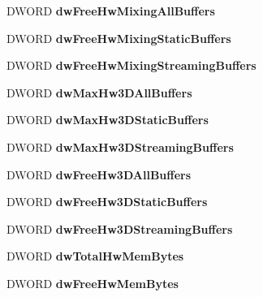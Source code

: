 \begin{DoxyCompactItemize}
D\+W\+O\+RD {\bfseries dw\+Free\+Hw\+Mixing\+All\+Buffers}
\item 
\mbox{\label{struct___d_s_c_a_p_s_a56367d5c0c0b0eb1fbd2903925ddd52a}} 
D\+W\+O\+RD {\bfseries dw\+Free\+Hw\+Mixing\+Static\+Buffers}
\item 
\mbox{\label{struct___d_s_c_a_p_s_a61d06b27d0885d632ab4b0362a09fd46}} 
D\+W\+O\+RD {\bfseries dw\+Free\+Hw\+Mixing\+Streaming\+Buffers}
\item 
\mbox{\label{struct___d_s_c_a_p_s_aebf532fb8ced15674d5036be79c6aef4}} 
D\+W\+O\+RD {\bfseries dw\+Max\+Hw3\+D\+All\+Buffers}
\item 
\mbox{\label{struct___d_s_c_a_p_s_a414aac4889d71650c616d284d2a34f39}} 
D\+W\+O\+RD {\bfseries dw\+Max\+Hw3\+D\+Static\+Buffers}
\item 
\mbox{\label{struct___d_s_c_a_p_s_a1f1c91dea1f61ec116631afb8d040de9}} 
D\+W\+O\+RD {\bfseries dw\+Max\+Hw3\+D\+Streaming\+Buffers}
\item 
\mbox{\label{struct___d_s_c_a_p_s_af700461df782af46f4e3a67c65e0ea0c}} 
D\+W\+O\+RD {\bfseries dw\+Free\+Hw3\+D\+All\+Buffers}
\item 
\mbox{\label{struct___d_s_c_a_p_s_a467e983988672ced4e0c928f40773f9d}} 
D\+W\+O\+RD {\bfseries dw\+Free\+Hw3\+D\+Static\+Buffers}
\item 
\mbox{\label{struct___d_s_c_a_p_s_a3bf6b7713a0210976870e0660e13b106}} 
D\+W\+O\+RD {\bfseries dw\+Free\+Hw3\+D\+Streaming\+Buffers}
\item 
\mbox{\label{struct___d_s_c_a_p_s_a4f6697d62521c353479444671ebd0c63}} 
D\+W\+O\+RD {\bfseries dw\+Total\+Hw\+Mem\+Bytes}
\item 
\mbox{\label{struct___d_s_c_a_p_s_aed2d2047b3c1380dbba020990bbb1a7e}} 
D\+W\+O\+RD {\bfseries dw\+Free\+Hw\+Mem\+Bytes}
\item 
\mbox{\label{struct___d_s_c_a_p_s_a095c40b0ea7be9112cfe2fae808bfe43}} 

\end{DoxyCompactItemize}
